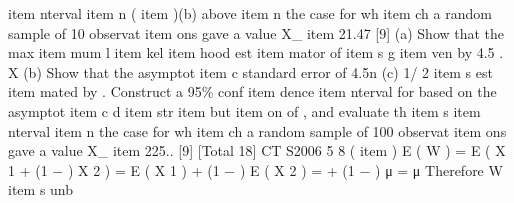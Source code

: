 item nterval %
item n (%
item )(b) above %
item n the case for wh%
item ch a random
sample of 10 observat%
item ons gave a value
X_{%
item } 21.47
[9]
(a) Show that the max%
item mum l%
item kel%
item hood est%
item mator of
item s g%
item ven by
4.5
.
X
(b)
Show that the asymptot%
item c standard error of
4.5n
(c)
1/ 2
item s est%
item mated by
.
Construct a 95\% conf%
item dence %
item nterval for based on the asymptot%
item c
d%
item str%
item but%
item on of , and evaluate th%
item s %
item nterval %
item n the case for wh%
item ch a
random sample of 100 observat%
item ons gave a value
X_{%
item } 225..
[9]
[Total 18]
CT S2006
5
8
(%
item )
E ( W ) = E ( \alpha X 1 + (1 − \alpha ) X 2 )
= \alpha E ( X 1 ) + (1 − \alpha ) E ( X 2 ) =  + (1 − \alpha ) μ = μ
Therefore W %
item s unb%
